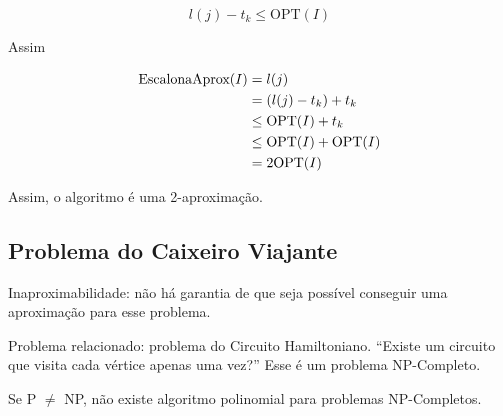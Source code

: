 \[
	l(j)-t_k \leq \mathrm{OPT}(I)
\]

Assim

\begin{align*}
	\text{\lstinline{EscalonaAprox}}(I) & = l(j)                                 \\
	                                    & = (l(j)-t_k)+t_k                       \\
	                                    & \leq \mathrm{OPT}(I) + t_k             \\
	                                    & \leq \mathrm{OPT}(I) + \mathrm{OPT}(I) \\
	                                    & =2 \mathrm{OPT}(I)
\end{align*}

Assim, o algoritmo é uma 2-aproximação.

\subsection{Problema do Caixeiro Viajante}

Inaproximabilidade: não há garantia de que seja possível conseguir uma aproximação para esse problema.

Problema relacionado: problema do Circuito Hamiltoniano. ``Existe um circuito que visita cada vértice apenas uma vez?'' Esse é um problema NP-Completo.

Se P $\neq$ NP, não existe algoritmo polinomial para problemas NP-Completos.

